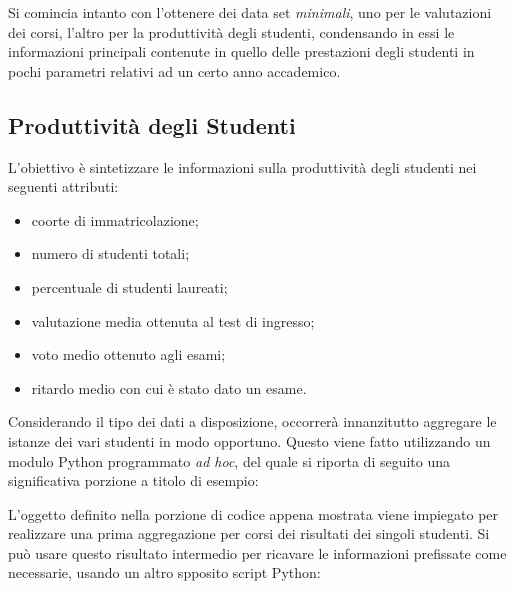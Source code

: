 	Si comincia intanto con l'ottenere dei data set \textit{minimali}, uno per le valutazioni dei corsi, l'altro per la produttività degli studenti, condensando in essi le informazioni principali contenute in quello delle prestazioni degli studenti in pochi parametri relativi ad un certo anno accademico. \\

	\subsection{Produttività degli Studenti}

		L'obiettivo è sintetizzare le informazioni sulla produttività degli studenti nei seguenti attributi:

		\begin{itemize}
			\item coorte di immatricolazione;
			\item numero di studenti totali;
			\item percentuale di studenti laureati;
			\item valutazione media ottenuta al test di ingresso;
			\item voto medio ottenuto agli esami;
			\item ritardo medio con cui è stato dato un esame.
		\end{itemize}

		Considerando il tipo dei dati a disposizione, occorrerà innanzitutto aggregare le istanze dei vari studenti in modo opportuno. Questo viene fatto utilizzando un modulo Python programmato \textit{ad hoc}, del quale si riporta di seguito una significativa porzione a titolo di esempio: \\

		

		\vspace{0.3cm}

		L'oggetto definito nella porzione di codice appena mostrata viene impiegato per realizzare una prima aggregazione per corsi dei risultati dei singoli studenti. Si può usare questo risultato intermedio per ricavare le informazioni prefissate come necessarie, usando un altro spposito script Python: \\

		

		\vspace{0.3cm}

